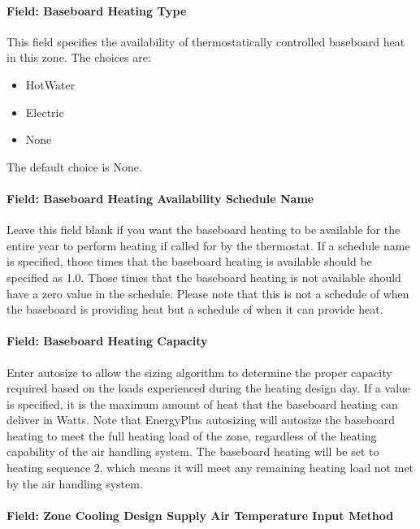 \paragraph{Field: Baseboard Heating Type}\label{field-baseboard-heating-type-10}

This field specifies the availability of thermostatically controlled baseboard heat in this zone. The choices are:

\begin{itemize}
\item
  HotWater
\item
  Electric
\item
  None
\end{itemize}

The default choice is None.

\paragraph{Field: Baseboard Heating Availability Schedule Name}\label{field-baseboard-heating-availability-schedule-name-10}

Leave this field blank if you want the baseboard heating to be available for the entire year to perform heating if called for by the thermostat. If a schedule name is specified, those times that the baseboard heating is available should be specified as 1.0. Those times that the baseboard heating is not available should have a zero value in the schedule. Please note that this is not a schedule of when the baseboard is providing heat but a schedule of when it can provide heat.

\paragraph{Field: Baseboard Heating Capacity}\label{field-baseboard-heating-capacity-10}

Enter autosize to allow the sizing algorithm to determine the proper capacity required based on the loads experienced during the heating design day. If a value is specified, it is the maximum amount of heat that the baseboard heating can deliver in Watts. Note that EnergyPlus autosizing will autosize the baseboard heating to meet the full heating load of the zone, regardless of the heating capability of the air handling system. The baseboard heating will be set to heating sequence 2, which means it will meet any remaining heating load not met by the air handling system.

\paragraph{Field: Zone Cooling Design Supply Air Temperature Input Method}\label{field-zone-cooling-design-supply-air-temperature-input-method-9}

